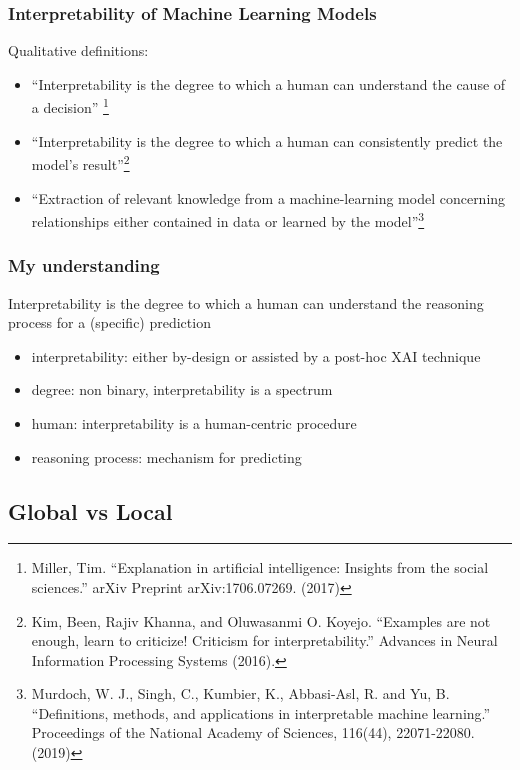 \begin{frame}
  \frametitle{Interpretability of Machine Learning Models}
  Qualitative definitions:
  \begin{itemize}
  \item<1-> ``Interpretability is the degree to which a human can understand the
    cause of a decision'' \footnote{Miller, Tim. ``Explanation in artificial
    intelligence: Insights from the social sciences.'' arXiv Preprint
    arXiv:1706.07269. (2017)}
  \item<2-> ``Interpretability is the degree to which a human can consistently
    predict the model’s result''\footnote{Kim, Been, Rajiv Khanna, and
    Oluwasanmi O. Koyejo. ``Examples are not enough, learn to criticize!
    Criticism for interpretability.'' Advances in Neural Information Processing
    Systems (2016).}
  \item<3-> ``Extraction of relevant knowledge from a machine-learning model
    concerning relationships either contained in data or learned by the
    model''\footnote{Murdoch, W. J., Singh, C., Kumbier, K., Abbasi-Asl, R. and
    Yu, B. ``Definitions, methods, and applications in interpretable machine
    learning.'' Proceedings of the National Academy of Sciences, 116(44),
    22071-22080. (2019)}
  \end{itemize}
\end{frame}

\begin{frame}
  \frametitle{My understanding}
  Interpretability is the degree to which a human can understand the reasoning process for a (specific) prediction

  \begin{itemize}
    \item interpretability: either by-design or assisted by a post-hoc XAI technique
    \item degree: non binary, interpretability is a spectrum
    \item human: interpretability is a human-centric procedure
    \item reasoning process: mechanism for predicting
  \end{itemize}
  \end{frame}

\subsection{Global vs Local}


